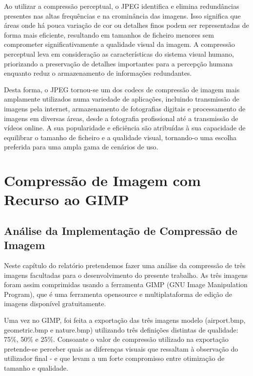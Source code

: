 \documentclass{article}
\begin{document}
Ao utilizar a compressão perceptual, o JPEG identifica e elimina redundâncias presentes nas altas frequências e na crominância das imagens. Isso significa que áreas onde há pouca variação de cor ou detalhes finos podem ser representadas de forma mais eficiente, resultando em tamanhos de ficheiro menores sem comprometer significativamente a qualidade visual da imagem. A compressão perceptual leva em consideração as características do sistema visual humano, priorizando a preservação de detalhes importantes para a percepção humana enquanto reduz o armazenamento de informações redundantes.

Desta forma, o JPEG tornou-se um dos codecs de compressão de imagem mais amplamente utilizados numa variedade de aplicações, incluindo transmissão de imagens pela internet, armazenamento de fotografias digitais e processamento de imagens em diversas áreas, desde a fotografia profissional até a transmissão de vídeos online. A sua popularidade e eficiência são atribuídas à sua capacidade de equilibrar o tamanho de ficheiro e a qualidade visual, tornando-o uma escolha preferida para uma ampla gama de cenários de uso.

\newpage
\section{Compressão de Imagem com Recurso ao GIMP}

\subsection{Análise da Implementação de Compressão de Imagem}

Neste capítulo do relatório pretendemos fazer uma análise da compressão de três imagens facultadas para o desenvolvimento do presente trabalho. As três imagens foram assim comprimidas usando a ferramenta GIMP (GNU Image Manipulation Program), que é uma ferramenta opensource e multiplataforma de edição de imagens disponível gratuitamente.

Uma vez no GIMP, foi feita a exportação das três imagens modelo (airport.bmp, geometric.bmp e nature.bmp) utilizando três definições distintas de qualidade: 75\%, 50\% e 25\%. Consoante o valor de compressão utilizado na exportação pretende-se perceber quais as diferenças visuais que ressaltam à observação do utilizador final - e que levam a um forte compromisso entre otimização de tamanho e qualidade.
\end{document}
